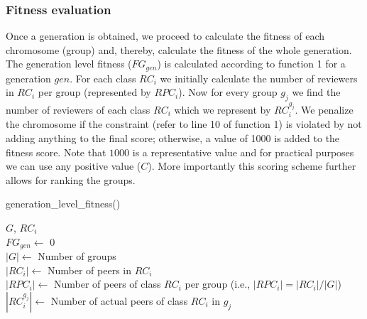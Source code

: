 \subsubsection{Fitness evaluation}
Once a generation is obtained, we proceed to calculate the fitness of each chromosome (group) and, thereby, calculate the fitness of the whole generation. 
The generation level fitness ($FG_{gen}$) is calculated according to function 1 for a generation $gen$. For each class $RC_i$ we initially calculate the number of reviewers in $RC_i$ 
per group (represented by $RPC_i$). Now for every group $g_j$ we find the number of reviewers of each class $RC_i$  which we represent by $RC_{i}^{g_j}$. We penalize the 
chromosome if the constraint (refer to line 10 of function 1) is violated by not adding anything to the final score; otherwise, a value of 1000 is added to the fitness score.
Note that $1000$ is a representative value and for practical purposes we can use any positive value ($C$). 
More importantly this scoring scheme further allows for ranking the groups. 
\begin{function1}
 \caption{generation\_level\_fitness()}
 $G$, $RC_i$ \\ 
 $FG_{gen} \leftarrow$ 0\\
 $|G|\leftarrow$ Number of groups\\
 $|RC_i|\leftarrow$ Number of peers in $RC_i$\\
 $|RPC_i|\leftarrow$ Number of peers of class $RC_i$ per group (i.e., $|RPC_i| = |RC_i|/|G|$) \\
 $|RC_{i}^{g_j}|\leftarrow$ Number of actual peers of class $RC_{i}$ in $g_j$\\
\end{function1}

